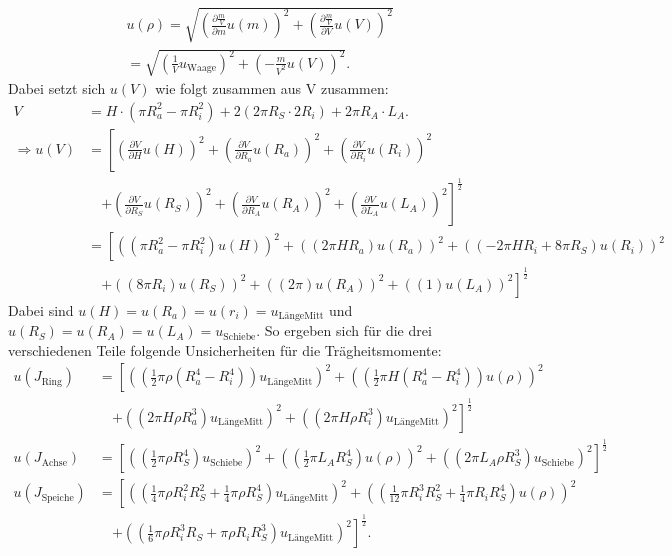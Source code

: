 \begin{align*}
u(\rho) = \sqrt{\left( \frac{\partial \frac{m}{V}}{\partial m}u(m)\right)^2 + \left( \frac{\partial \frac{m}{V}}{\partial V}u(V)\right)^2} \\
= \sqrt{\left(\frac{1}{V}u_\text{Waage}\right)^2 + \left(- \frac{m}{V^2}u(V)\right)^2}. 
\end{align*}
Dabei setzt sich $u(V)$ wie folgt zusammen aus V zusammen:
\begin{align*}
V &= H\cdot(\pi R_a^2 - \pi R_i^2) + 2(2\pi R_S\cdot 2 R_i) + 2\pi R_A\cdot L_A. \\		
\Rightarrow u(V) &= \left[\left( \frac{\partial V}{\partial H}u(H)\right)^2 
+ \left( \frac{\partial V}{\partial R_a}u(R_a)\right)^2 
+ \left( \frac{\partial V}{\partial R_i}u(R_i)\right)^2 \right.\\ 
&\quad\left.+ \left( \frac{\partial V}{\partial R_S}u(R_S)\right)^2 
+ \left( \frac{\partial V}{\partial R_A}u(R_A)\right)^2 
+ \left( \frac{\partial V}{\partial L_A}u(L_A)\right)^2\right]^{\frac{1}{2}} \\		
&= \left[\left( (\pi R_a^2 - \pi R_i^2)u(H)\right)^2 
+ \left( (2\pi H R_a)u(R_a)\right)^2 
+ \left( (-2\pi H R_i+8\pi R_S)u(R_i)\right)^2 \right.\\ 
&\quad\left.+ \left( (8\pi R_i)u(R_S)\right)^2 
+ \left( (2\pi)u(R_A)\right)^2 
+ \left( (1)u(L_A)\right)^2\right]^{\frac{1}{2}}		
\end{align*}
Dabei sind $u(H)=u(R_a)=u(r_i)=u_\text{LängeMitt}$ und $u(R_S)=u(R_A)=u(L_A)=u_\text{Schiebe}$.
So ergeben sich für die drei verschiedenen Teile folgende Unsicherheiten für die Trägheitsmomente:
\begin{align*}
u(J_\text{Ring}) &= 
\left[\left( (\frac{1}{2}\pi\rho (R_a^4 - R_i^4))u_\text{LängeMitt}\right)^2  				
+ \left( (\frac{1}{2}\pi H (R_a^4 - R_i^4))u(\rho)\right)^2 \right.\\ 
&\quad\left.+ \left( (2\pi H \rho R_a^3)u_\text{LängeMitt}\right)^2
+ \left( (2\pi H \rho R_i^3)u_\text{LängeMitt}\right)^2\right]^{\frac{1}{2}}\\
u(J_\text{Achse}) &= 
\left[\left( (\frac{1}{2}\pi\rho R_S^4)u_\text{Schiebe}\right)^2  				
+ \left( (\frac{1}{2}\pi L_A R_S^4)u(\rho)\right)^2  
+ \left( (2\pi L_A \rho R_S^3)u_\text{Schiebe}\right)^2\right]^{\frac{1}{2}}\\
u(J_\text{Speiche}) &= 
\left[\left( (\frac{1}{4}\pi\rho R_i^2 R_S^2+\frac{1}{4}\pi\rho R_S^4)u_\text{LängeMitt}\right)^2  				
+ \left( (\frac{1}{12}\pi R_i^3 R_S^2 + \frac{1}{4}\pi R_i R_S^4)u(\rho)\right)^2\right. \\ 
&\quad\left.+ \left( (\frac{1}{6}\pi \rho R_i^3 R_S + \pi \rho R_i R_S^3)u_\text{LängeMitt}\right)^2\right]^{\frac{1}{2}}.	  
\end{align*}
